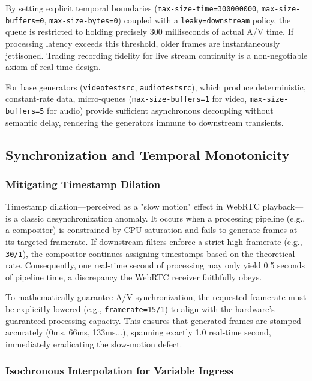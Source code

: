 \documentclass{article}
\begin{document}
By setting explicit temporal boundaries (\texttt{max-size-time=300000000}, \texttt{max-size-buffers=0}, \texttt{max-size-bytes=0})
coupled with a \texttt{leaky=downstream} policy, the queue is restricted to holding precisely 300 milliseconds
of actual A/V time. If processing latency exceeds this threshold, older frames are instantaneously
jettisoned. Trading recording fidelity for live stream continuity is a non-negotiable axiom of real-time design.

For base generators (\texttt{videotestsrc}, \texttt{audiotestsrc}), which produce deterministic, constant-rate data,
micro-queues (\texttt{max-size-buffers=1} for video, \texttt{max-size-buffers=5} for audio) provide sufficient
asynchronous decoupling without semantic delay, rendering the generators immune to downstream transients.

\subsection{Synchronization and Temporal Monotonicity}

\subsubsection{Mitigating Timestamp Dilation}

Timestamp dilation—perceived as a "slow motion" effect in WebRTC playback—is a classic desynchronization anomaly.
It occurs when a processing pipeline (e.g., a compositor) is constrained by CPU saturation and fails to generate
frames at its targeted framerate. If downstream filters enforce a strict high framerate (e.g., \texttt{30/1}),
the compositor continues assigning timestamps based on the theoretical rate. Consequently, one real-time
second of processing may only yield 0.5 seconds of pipeline time, a discrepancy the WebRTC receiver faithfully obeys.

To mathematically guarantee A/V synchronization, the requested framerate must be explicitly lowered
(e.g., \texttt{framerate=15/1}) to align with the hardware's guaranteed processing capacity. This ensures
that generated frames are stamped accurately (0ms, 66ms, 133ms...), spanning exactly 1.0 real-time
second, immediately eradicating the slow-motion defect.

\subsubsection{Isochronous Interpolation for Variable Ingress}
\end{document}
